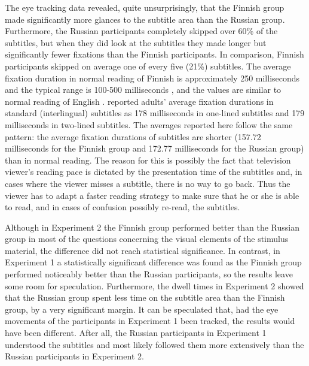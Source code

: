 \documentclass[output=paper]{langsci/langscibook}
\begin{document}
The eye tracking data revealed, quite unsurprisingly, that the Finnish group made significantly more glances to the subtitle area than the Russian group. Furthermore, the Russian participants completely skipped over 60\% of the subtitles, but when they did look at the subtitles they made longer but significantly fewer fixations than the Finnish participants. In comparison, Finnish participants skipped on average one of every five (21\%) subtitles. The average fixation duration in normal reading of Finnish is approximately 250 milliseconds and the typical range is 100-500 milliseconds \citep{hyona1996}, and the values are similar to normal reading of English \citep{Rayner1998}. \citet{Bruycker2007} reported adults’ average fixation durations in standard (interlingual) subtitles as 178 milliseconds in one-lined subtitles and 179 milliseconds in two-lined subtitles. The averages reported here follow the same pattern: the average fixation durations of subtitles are shorter (157.72 milliseconds for the Finnish group and 172.77 milliseconds for the Russian group) than in normal reading. The reason for this is possibly the fact that television viewer’s reading pace is dictated by the presentation time of the subtitles and, in cases where the viewer misses a subtitle, there is no way to go back. Thus the viewer has to adapt a faster reading strategy to make sure that he or she is able to read, and in cases of confusion possibly re-read, the subtitles. 

Although in Experiment 2 the Finnish group performed better than the Russian group in most of the questions concerning the visual elements of the stimulus material, the difference did not reach statistical significance. In contrast, in Experiment 1 a statistically significant difference was found as the Finnish group performed noticeably better than the Russian participants, so the results leave some room for speculation. Furthermore, the dwell times in Experiment 2 showed that the Russian group spent less time on the subtitle area than the Finnish group, by a very significant margin. It can be speculated that, had the eye movements of the participants in Experiment 1 been tracked, the results would have been different. After all, the Russian participants in Experiment 1 understood the subtitles and most likely followed them more extensively than the Russian participants in Experiment 2.
\end{document}
